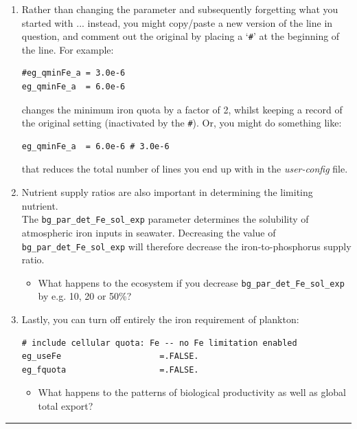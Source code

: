 \begin{enumerate}[noitemsep]
\vspace{1mm}
\item[NOTE:] Rather than changing the parameter and subsequently forgetting what you started with ... instead, you might copy/paste a new version of the line in question, and comment out the original by placing a `\texttt{\#}' at the beginning of the line. For example:
\vspace{-1mm}\small\begin{verbatim}
#eg_qminFe_a = 3.0e-6
eg_qminFe_a  = 6.0e-6
\end{verbatim}\normalsize\vspace{-1mm}
changes the minimum iron quota by a factor of 2, whilst keeping a record of the original setting (inactivated by the \texttt{\#}). Or, you might do something like:
\vspace{-1mm}\small\begin{verbatim}
eg_qminFe_a  = 6.0e-6 # 3.0e-6
\end{verbatim}\normalsize\vspace{-1mm}
that reduces the total number of lines you end up with in the \textit{user-config} file.

\vspace{1mm}
\item Nutrient supply ratios are also important in determining the limiting nutrient.
\\The \texttt{bg\_par\_det\_Fe\_sol\_exp} parameter determines the solubility of atmospheric iron inputs in seawater. Decreasing the value of \texttt{bg\_par\_det\_Fe\_sol\_exp} will therefore decrease the iron-to-phosphorus supply ratio.

\vspace{1mm}
\begin{itemize}
\item What happens to the ecosystem if you decrease \texttt{bg\_par\_det\_Fe\_sol\_exp} by e.g. 10, 20 or 50\%?
\end{itemize}

\vspace{1mm}
\item Lastly, you can turn off entirely the iron requirement of plankton:
\vspace{-1mm}\small\begin{verbatim}
# include cellular quota: Fe -- no Fe limitation enabled
eg_useFe                    =.FALSE.
eg_fquota                   =.FALSE.
\end{verbatim}\normalsize\vspace{-1mm}
\vspace{1mm}
\begin{itemize}
\item What happens to the patterns of biological productivity as well as global total export?
\end{itemize}

\end{enumerate}

\vspace{1mm}
\noindent\rule{4cm}{0.1mm}

